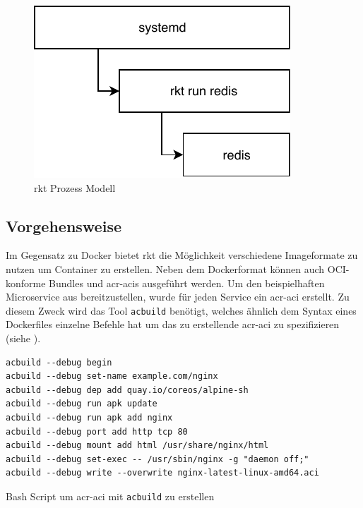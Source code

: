 \begin{figure}[h]
	\begin{center}
		\includegraphics[scale=0.9]{bilder/rkt-process.pdf}
		\caption{rkt Prozess Modell \citep{RktVsOtherProjects}}
		\label{fig:rktProcessModell}		
	\end{center}
\end{figure}


\subsection{Vorgehensweise}
\label{sec:compRktVorgehen}

Im Gegensatz zu Docker bietet rkt die Möglichkeit verschiedene Imageformate zu nutzen um Container zu erstellen. Neben dem Dockerformat können auch OCI-konforme Bundles und \glspl{acr-aci} ausgeführt werden. Um den beispielhaften Microservice aus  bereitzustellen, wurde für jeden Service ein \gls{acr-aci} erstellt. Zu diesem Zweck wird das Tool \texttt{acbuild} benötigt, welches ähnlich dem Syntax eines Dockerfiles einzelne Befehle hat um das zu erstellende \gls{acr-aci} zu spezifizieren (siehe ).

\begin{listing}[h]
	\begin{verbatim}
acbuild --debug begin
acbuild --debug set-name example.com/nginx
acbuild --debug dep add quay.io/coreos/alpine-sh
acbuild --debug run apk update
acbuild --debug run apk add nginx
acbuild --debug port add http tcp 80
acbuild --debug mount add html /usr/share/nginx/html
acbuild --debug set-exec -- /usr/sbin/nginx -g "daemon off;"
acbuild --debug write --overwrite nginx-latest-linux-amd64.aci
	\end{verbatim}
	\caption{Bash Script um \gls{acr-aci} mit \texttt{acbuild} zu erstellen \citep{AppContainer}}
	\label{lst:acbuildCommands}
\end{listing}


